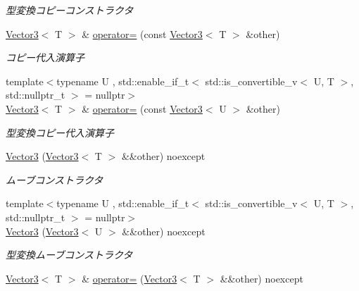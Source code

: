 \begin{DoxyCompactItemize}
\begin{DoxyCompactList}\small\item\em 型変換コピーコンストラクタ \end{DoxyCompactList}\item 
\mbox{\hyperlink{classsaki_1_1_vector3}{Vector3}}$<$ T $>$ \& \mbox{\hyperlink{classsaki_1_1_vector3_a8a103fbd68dd37b36ffc030e36745c97}{operator=}} (const \mbox{\hyperlink{classsaki_1_1_vector3}{Vector3}}$<$ T $>$ \&other)
\begin{DoxyCompactList}\small\item\em コピー代入演算子 \end{DoxyCompactList}\item 
{\footnotesize template$<$typename U , std\+::enable\+\_\+if\+\_\+t$<$ std\+::is\+\_\+convertible\+\_\+v$<$ U, T $>$, std\+::nullptr\+\_\+t $>$  = nullptr$>$ }\\\mbox{\hyperlink{classsaki_1_1_vector3}{Vector3}}$<$ T $>$ \& \mbox{\hyperlink{classsaki_1_1_vector3_aa2ae3bfecb3dc9c6a8c56c29ae19a588}{operator=}} (const \mbox{\hyperlink{classsaki_1_1_vector3}{Vector3}}$<$ U $>$ \&other)
\begin{DoxyCompactList}\small\item\em 型変換コピー代入演算子 \end{DoxyCompactList}\item 
\mbox{\hyperlink{classsaki_1_1_vector3_a89d4f00d2a4b3b4f686079b67709c05c}{Vector3}} (\mbox{\hyperlink{classsaki_1_1_vector3}{Vector3}}$<$ T $>$ \&\&other) noexcept
\begin{DoxyCompactList}\small\item\em ムーブコンストラクタ \end{DoxyCompactList}\item 
{\footnotesize template$<$typename U , std\+::enable\+\_\+if\+\_\+t$<$ std\+::is\+\_\+convertible\+\_\+v$<$ U, T $>$, std\+::nullptr\+\_\+t $>$  = nullptr$>$ }\\\mbox{\hyperlink{classsaki_1_1_vector3_a5411cf7b618b0b02e2dedcdb5c72f447}{Vector3}} (\mbox{\hyperlink{classsaki_1_1_vector3}{Vector3}}$<$ U $>$ \&\&other) noexcept
\begin{DoxyCompactList}\small\item\em 型変換ムーブコンストラクタ \end{DoxyCompactList}\item 
\mbox{\hyperlink{classsaki_1_1_vector3}{Vector3}}$<$ T $>$ \& \mbox{\hyperlink{classsaki_1_1_vector3_a970ff174a4c8508b6798011086ed9cb5}{operator=}} (\mbox{\hyperlink{classsaki_1_1_vector3}{Vector3}}$<$ T $>$ \&\&other) noexcept

\end{DoxyCompactItemize}

